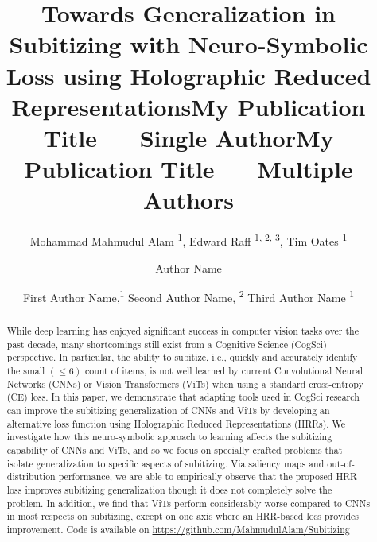\documentclass[letterpaper]{article} %
\title{Towards Generalization in Subitizing with Neuro-Symbolic Loss using Holographic Reduced Representations}
\author{Mohammad Mahmudul Alam \textsuperscript{\rm 1},
Edward Raff \textsuperscript{\rm 1, 2, 3},
Tim Oates \textsuperscript{\rm 1}
}
\title{My Publication Title --- Single Author}
\author {
    Author Name
}
\title{My Publication Title --- Multiple Authors}
\author {
    First Author Name,\textsuperscript{\rm 1}
    Second Author Name, \textsuperscript{\rm 2}
    Third Author Name \textsuperscript{\rm 1}
}
\begin{document}
\maketitle

\begin{abstract}
While deep learning has enjoyed significant success in computer vision tasks over the past decade, many shortcomings still exist from a Cognitive Science (CogSci) perspective. In particular, the ability to subitize, i.e., quickly and accurately identify the small $(\leq 6)$ count of items, is not well learned by current Convolutional Neural Networks (CNNs) or Vision Transformers (ViTs) when using a standard cross-entropy (CE) loss. In this paper, we demonstrate that adapting tools used in CogSci research can improve the subitizing generalization of CNNs and ViTs by developing an alternative loss function using Holographic Reduced Representations (HRRs).  We investigate how this neuro-symbolic approach to learning affects the subitizing capability of CNNs and ViTs, and so we focus on specially crafted problems that isolate generalization to specific aspects of subitizing. Via saliency maps and out-of-distribution performance, we are able to empirically observe that the proposed HRR loss improves subitizing generalization though it does not completely solve the problem. In addition, we find that ViTs perform considerably worse compared to CNNs in most respects on subitizing, except on one axis where an HRR-based loss provides improvement. Code is available on \color{magenta}\url{https://github.com/MahmudulAlam/Subitizing}
\end{abstract}

\end{document}
